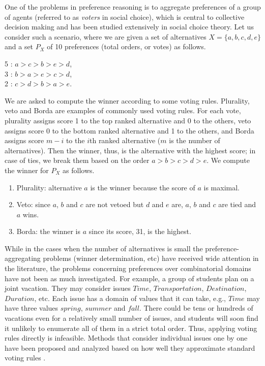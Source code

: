 One of the problems in preference reasoning is to
aggregate preferences of a group of
agents (referred
to as \emph{voters} in social choice), which is central to collective decision making and has been studied
extensively in social choice theory. 
Let us consider such a scenario, where we are
given a set of alternatives $X = \{ a,b,c,d,e \}$ and a set $P_X$ of 10 
preferences (total orders, or votes) as follows.
	\begin{center}
		5 : $a > c > b > e > d$,\\
		3 : $b > a > e > c > d$,\\
		2 : $c > d > b > a > e$.
	\end{center}
	
	We are asked to compute the winner according to some voting rules. 
	Plurality, veto and Borda are examples of commonly used voting rules.
	For each vote, plurality assigns score 1 to the top ranked alternative
	and 0 to the others, veto assigns score 0 to the bottom ranked alternative
	and 1 to the others, and Borda assigns score $m-i$ to the $i$th ranked 
	alternative ($m$ is the number of alternatives).
	Then the winner, thus, is the alternative with the highest score; in case of
	ties, we break them based on the order $a > b > c > d > e$.
	We compute the winner for $P_X$ as follows.
	
	\begin{enumerate}  \itemsep -4pt
		\item Plurality: alternative $a$ is the winner because the score of $a$ is maximal.
		\item Veto: since $a$, $b$ and $c$ are not vetoed but $d$ and $e$ are, 
					$a$, $b$ and $c$ are tied and $a$ wins.
		\item Borda: the winner is $a$ since its score, 31, is the highest.
	\end{enumerate}


While in the cases when the
number of alternatives is small the preference-aggregating problems (winner determination, 
etc) have received wide attention in the literature,
the problems concerning preferences over combinatorial
domains have not been as much investigated.
For example, a group of students plan on a joint vacation.
They may consider issues $Time$, $Transportation$,
$Destination$, $Duration$, etc.  
Each issue has a domain of values that it can take, e.g.,
$Time$ may have three values $spring$, $summer$ and $fall$.
There could be tens or hundreds of vacations even for
a relatively small number of issues, and
students will soon find it unlikely to enumerate all of
them in a strict total order.
Thus, applying voting rules directly is infeasible.
Methods that consider individual issues one by one have been proposed
and analyzed based on how well they approximate standard voting rules
\cite{fargier:ibi,Xia:SMV}.

